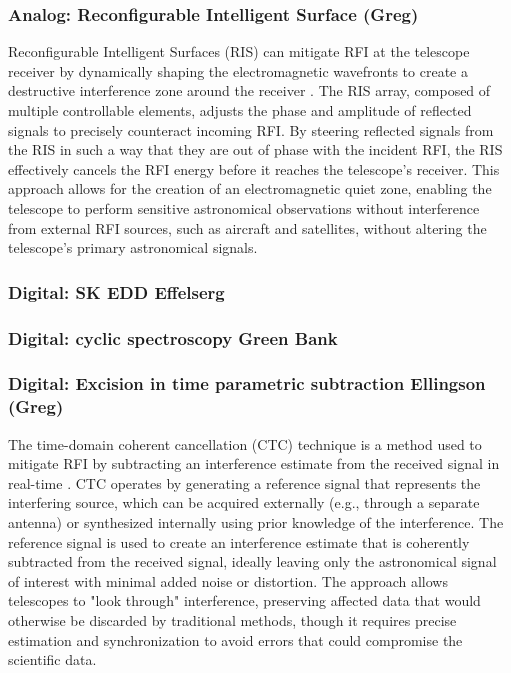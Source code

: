 \subsubsection{Analog: Reconfigurable Intelligent Surface (Greg)}

Reconfigurable Intelligent Surfaces (RIS) can mitigate RFI at the telescope receiver by dynamically shaping the electromagnetic wavefronts to create a destructive interference zone around the receiver \cite{zou2022scisrs,wei2024ris,wei2023multistage}. The RIS array, composed of multiple controllable elements, adjusts the phase and amplitude of reflected signals to precisely counteract incoming RFI. By steering reflected signals from the RIS in such a way that they are out of phase with the incident RFI, the RIS effectively cancels the RFI energy before it reaches the telescope’s receiver. This approach allows for the creation of an electromagnetic quiet zone, enabling the telescope to perform sensitive astronomical observations without interference from external RFI sources, such as aircraft and satellites, without altering the telescope’s primary astronomical signals.

\subsubsection{Digital: SK EDD Effelserg}
\subsubsection{Digital: cyclic spectroscopy Green Bank}

\subsubsection{Digital: Excision in time parametric subtraction Ellingson (Greg)}

The time-domain coherent cancellation (CTC) technique is a method used to mitigate RFI by subtracting an interference estimate from the received signal in real-time \cite{ellingson2022coherent}. CTC operates by generating a reference signal that represents the interfering source, which can be acquired externally (e.g., through a separate antenna) or synthesized internally using prior knowledge of the interference. The reference signal is used to create an interference estimate that is coherently subtracted from the received signal, ideally leaving only the astronomical signal of interest with minimal added noise or distortion. The approach allows telescopes to "look through" interference, preserving affected data that would otherwise be discarded by traditional methods, though it requires precise estimation and synchronization to avoid errors that could compromise the scientific data.

